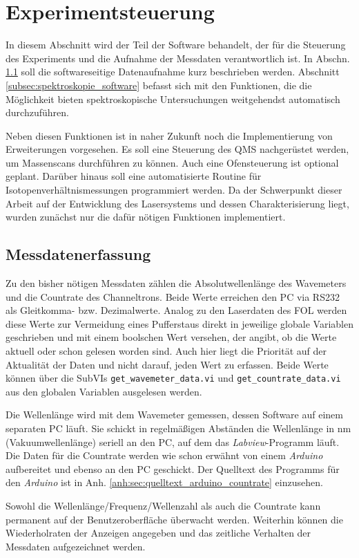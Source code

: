 \section{Experimentsteuerung}\label{sec:experimentsteuerung}
In diesem Abschnitt wird der Teil der Software behandelt, der für die Steuerung
des Experiments und die Aufnahme der Messdaten verantwortlich ist. In Abschn.
\ref{subsec:messdatenerfassung} soll die softwareseitige Datenaufnahme kurz
beschrieben werden. Abschnitt \ref{subsec:spektroskopie_software} befasst sich mit den
Funktionen, die die Möglichkeit bieten spektroskopische Untersuchungen
weitgehendst automatisch durchzuführen.\par
Neben diesen Funktionen ist in naher Zukunft noch die Implementierung von
Erweiterungen vorgesehen. Es soll eine Steuerung des QMS nachgerüstet werden, um
Massenscans durchführen zu können. Auch eine Ofensteuerung ist optional geplant.
Darüber hinaus soll eine automatisierte Routine für Isotopenverhältnismessungen
programmiert werden. Da der Schwerpunkt dieser Arbeit auf der Entwicklung des
Lasersystems und dessen Charakterisierung liegt, wurden zunächst nur die dafür
nötigen Funktionen implementiert.

\subsection{Messdatenerfassung}\label{subsec:messdatenerfassung}
Zu den bisher nötigen Messdaten zählen die Absolutwellenlänge des Wavemeters und
die Countrate des Channeltrons. Beide Werte erreichen den PC via RS232 als
Gleitkomma- bzw. Dezimalwerte. Analog zu den Laserdaten des FOL werden diese
Werte zur Vermeidung eines Pufferstaus direkt in jeweilige globale Variablen
geschrieben und mit einem boolschen Wert versehen, der angibt, ob die Werte
aktuell oder schon gelesen worden sind. Auch hier liegt die Priorität auf der
Aktualität der Daten und nicht darauf, jeden Wert zu erfassen. Beide Werte
können über die SubVIs \lstinline|get_wavemeter_data.vi| und
\lstinline|get_countrate_data.vi| aus den globalen Variablen ausgelesen
werden.\par
Die Wellenlänge wird mit dem Wavemeter gemessen, dessen Software auf einem
separaten PC läuft. Sie schickt in regelmäßigen Abständen die Wellenlänge in nm
(Vakuumwellenlänge) seriell an den PC, auf dem das \textit{Labview}-Programm läuft. Die Daten für die Countrate werden wie schon
erwähnt von einem \textit{Arduino} aufbereitet und ebenso an
den PC geschickt. Der Quelltext des Programms für den \textit{Arduino} ist in Anh.
\ref{anh:sec:quelltext_arduino_countrate} einzusehen.\par
Sowohl die Wellenlänge/Frequenz/Wellenzahl als auch die Countrate kann
permanent auf der Benutzeroberfläche überwacht werden. Weiterhin können die
Wiederholraten der Anzeigen angegeben und das zeitliche Verhalten der Messdaten
aufgezeichnet werden.

